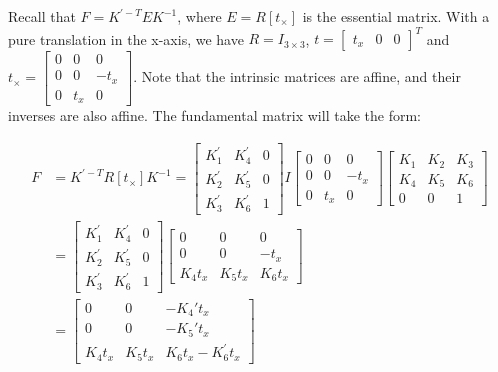 \documentclass{scrbook}
\begin{document}
Recall that $F=K^{'-T}EK^{-1}$, where $E=R\left[t_{\times }\right]$ is the essential matrix. With a pure translation in the x-axis, we have $R=I_{3\times 3}$, $t=\left[\begin{array}{ccc}
t_{x} & 0 & 0
\end{array}\right]^{T}$ and $t_{\times }=\left[\begin{array}{ccc}
0 & 0 & 0\\
0 & 0 & -t_{x}\\
0 & t_{x} & 0
\end{array}\right]$. Note that the intrinsic matrices are affine, and their inverses are also affine. The fundamental matrix will take the form:

\begin{align*}
F&=K^{'-T}R\left[t_{\times }\right]K^{-1}=\begin{bmatrix}
{K}_{1}^{'} & {K}_{4}^{'} & 0\\
{K}_{2}^{'} & {K}_{5}^{'} & 0\\
{K}_{3}^{'} & {K}_{6}^{'} & 1
\end{bmatrix}I\left[\begin{array}{ccc}
0 & 0 & 0\\
0 & 0 & -t_{x}\\
0 & t_{x} & 0
\end{array}\right]\begin{bmatrix}
K_{1} & K_{2} & K_{3}\\
K_{4} & K_{5} & K_{6}\\
0 & 0 & 1
\end{bmatrix} \\
&=\begin{bmatrix}
{K}_{1}^{'} & {K}_{4}^{'} & 0\\
{K}_{2}^{'} & {K}_{5}^{'} & 0\\
{K}_{3}^{'} & {K}_{6}^{'} & 1
\end{bmatrix}\left[\begin{array}{ccc}
0 & 0 & 0\\
0 & 0 & -t_{x}\\
K_{4}t_{x} & K_{5}t_{x} & K_{6}t_{x}
\end{array}\right] \\
&=\left[\begin{array}{ccc}
0 & 0 & -K_{4}'t_{x}\\
0 & 0 & -K_{5}'t_{x}\\
K_{4}t_{x} & K_{5}t_{x} & K_{6}t_{x}-{K}_{6}^{'}t_{x}
\end{array}\right] 
\end{align*}
\end{document}
